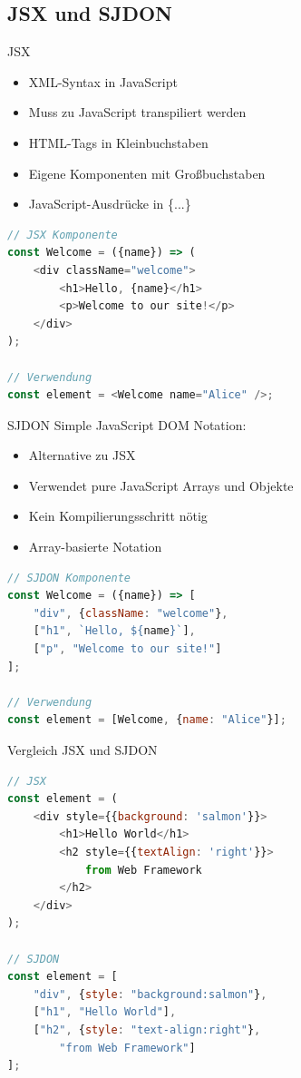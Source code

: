 \subsection{JSX und SJDON}

\begin{definition}{JSX}
    \begin{itemize}
        \item XML-Syntax in JavaScript
        \item Muss zu JavaScript transpiliert werden
        \item HTML-Tags in Kleinbuchstaben
        \item Eigene Komponenten mit Großbuchstaben
        \item JavaScript-Ausdrücke in \{...\}
    \end{itemize}
\begin{lstlisting}[language=JavaScript, style=basesmol]
// JSX Komponente
const Welcome = ({name}) => (
    <div className="welcome">
        <h1>Hello, {name}</h1>
        <p>Welcome to our site!</p>
    </div>
);

// Verwendung
const element = <Welcome name="Alice" />;
\end{lstlisting}
\end{definition}

\begin{definition}{SJDON}
    Simple JavaScript DOM Notation:
    \begin{itemize}
        \item Alternative zu JSX
        \item Verwendet pure JavaScript Arrays und Objekte
        \item Kein Kompilierungsschritt nötig
        \item Array-basierte Notation
    \end{itemize}
\begin{lstlisting}[language=JavaScript, style=basesmol]
// SJDON Komponente
const Welcome = ({name}) => [
    "div", {className: "welcome"},
    ["h1", `Hello, ${name}`],
    ["p", "Welcome to our site!"]
];

// Verwendung
const element = [Welcome, {name: "Alice"}];
\end{lstlisting}
\end{definition}

\begin{KR}{Vergleich JSX und SJDON}
\begin{lstlisting}[language=JavaScript, style=basesmol]
// JSX
const element = (
    <div style={{background: 'salmon'}}>
        <h1>Hello World</h1>
        <h2 style={{textAlign: 'right'}}>
            from Web Framework
        </h2>
    </div>
);

// SJDON
const element = [
    "div", {style: "background:salmon"},
    ["h1", "Hello World"],
    ["h2", {style: "text-align:right"}, 
        "from Web Framework"]
];
\end{lstlisting}
\end{KR}

